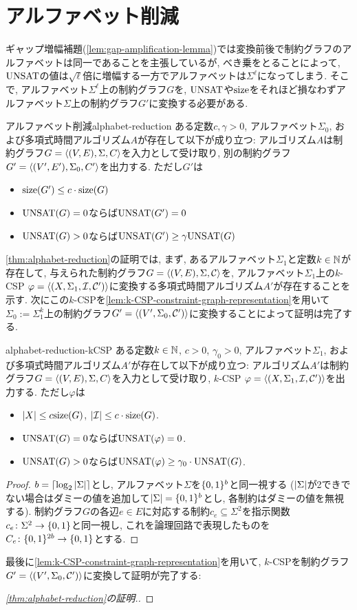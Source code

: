 \section{アルファベット削減}
ギャップ増幅補題(\cref{lem:gap-amplification-lemma})では変換前後で制約グラフのアルファベットは同一であることを主張しているが,
べき乗をとることによって, $\mathrm{UNSAT}$の値は$\sqrt{\ell}$倍に増幅する一方でアルファベットは$\Sigma^\ell$になってしまう.
そこで, アルファベット$\Sigma^\ell$上の制約グラフ$G$を, $\mathrm{UNSAT}$や$\mathrm{size}$をそれほど損なわずアルファベット$\Sigma$上の制約グラフ$G'$に変換する必要がある.
\begin{theorem}{アルファベット削減}{alphabet-reduction}
  ある定数$c,\gamma>0$, アルファベット$\Sigma_0$, および多項式時間アルゴリズム$A$が存在して以下が成り立つ:
  アルゴリズム$A$は制約グラフ$G=\langle(V,E),\Sigma,C\rangle$を入力として受け取り,
  別の制約グラフ$G'=\langle(V',E'),\Sigma_0,C'\rangle$を出力する.
  ただし$G'$は
  \begin{itemize}
    \item $\mathrm{size}(G') \le c\cdot \mathrm{size}(G)$
    \item $\mathrm{UNSAT}(G)=0$ならば$\mathrm{UNSAT}(G')=0$
    \item $\mathrm{UNSAT}(G)>0$ならば$\mathrm{UNSAT}(G') \ge \gamma\mathrm{UNSAT}(G)$
  \end{itemize}
\end{theorem}
\cref{thm:alphabet-reduction}の証明では,
  まず, あるアルファベット$\Sigma_1$と定数$k\in\mathbb{N}$が存在して,
  与えられた制約グラフ$G=\langle(V,E),\Sigma,\mathcal{C}\rangle$を, アルファベット$\Sigma_1$上の$k$-CSP $\varphi=\langle(X,\Sigma_1,\mathcal{I},\mathcal{C}')\rangle$に変換する多項式時間アルゴリズム$A'$が存在することを示す.
  次にこの$k$-CSPを\cref{lem:k-CSP-constraint-graph-representation}を用いて$\Sigma_0:=\Sigma_1^k$上の制約グラフ$G'=\langle(V',\Sigma_0,\mathcal{C}')\rangle$に変換することによって証明は完了する.

\begin{lemma}{}{alphabet-reduction-kCSP}
  ある定数$k\in\mathbb{N}$, $c>0$, $\gamma_0>0$, アルファベット$\Sigma_1$, および多項式時間アルゴリズム$A'$が存在して以下が成り立つ:
  アルゴリズム$A'$は制約グラフ$G=\langle(V,E),\Sigma,C\rangle$を入力として受け取り,
  $k$-CSP $\varphi=\langle(X,\Sigma_1,\mathcal{I},\mathcal{C}')\rangle$を出力する.
  ただし$\varphi$は
  \begin{itemize}
    \item $\abs{X} \le c\mathrm{size}(G)$, $\abs{\mathcal{I}} \le c\cdot\mathrm{size}(G)$.
    \item $\mathrm{UNSAT}(G)=0$ならば$\mathrm{UNSAT}(\varphi)=0$.
    \item $\mathrm{UNSAT}(G)>0$ならば$\mathrm{UNSAT}(\varphi) \ge \gamma_0\cdot\mathrm{UNSAT}(G)$.
  \end{itemize}
\end{lemma}
\begin{proof}
  $b = \lceil\log_2\abs{\Sigma}\rceil$とし, アルファベット$\Sigma$を$\{0,1\}^b$と同一視する
  ($\abs{\Sigma}$が2できでない場合はダミーの値を追加して$\abs{\Sigma}=\{0,1\}^b$とし, 各制約はダミーの値を無視する).
  制約グラフ$G$の各辺$e\in E$に対応する制約$c_e\subseteq \Sigma^2$を指示関数$c_e\colon\Sigma^2\to\{0,1\}$と同一視し, これを論理回路で表現したものを$C_e\colon \{0,1\}^{2b}\to \{0,1\}$とする.
\end{proof}

最後に\cref{lem:k-CSP-constraint-graph-representation}を用いて, $k$-CSPを制約グラフ$G'=\langle(V',\Sigma_0,\mathcal{C}')\rangle$に変換して証明が完了する:
\begin{proof}[\cref{thm:alphabet-reduction}の証明.]

\end{proof}


